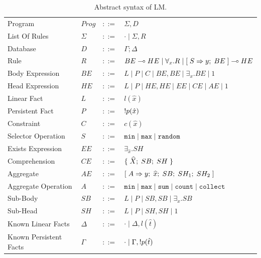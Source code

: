 \begin{table}[h]
\centering
\begin{tabular}{ l l c l }
  Program & $Prog$ & $::=$ & $\Sigma, D$ \\
  List Of Rules & $\Sigma$ & $::=$ & $\cdot \; | \; \Sigma, R$\\
  Database & $D$ & $::=$ & $\Gamma; \Delta$ \\
  Rule & $R$ & $::=$ & $BE \multimap HE \; | \; \forall_{x}. R \; | \; [\; S \Rightarrow y; \; BE \;] \multimap HE$ \\
  Body Expression & $BE$ & $::=$ & $L \; | \; P \; | \; C \; | \; BE, BE \; | \; \exists_{x}. BE \; | \; 1$\\
  Head Expression & $HE$ & $::=$ & $L \; | \; P \; | \; HE, HE \; | \; EE \; | \; CE \; | \; AE \; | \; 1$\\
  
  Linear Fact & $L$ & $::=$ & $l(\hat{x})$\\
  Persistent Fact & $P$ & $::=$ & ${!} p(\hat{x})$\\
  Constraint & $C$ & $::=$ & $c(\hat{x})$ \\
  Selector Operation & $S$ & $::=$ & $\mathtt{min} \; | \; \mathtt{max} \; | \; \mathtt{random}$\\
  
  Exists Expression & $EE$ & $::=$ & $\exists_{\widehat{x}}. SH$ \\
  Comprehension & $CE$ & $::=$ & $\{ \; \widehat{X}; \; SB; \; SH \; \}$ \\

  Aggregate & $AE$ & $::=$ & $[\; A \Rightarrow y; \; \widehat{x}; \; SB; \; SH_1; \; SH_2 \;]$ \\
  Aggregate Operation & $A$ & $::=$ & $\mathtt{min} \; | \; \mathtt{max} \; | \;
\mathtt{sum} \; | \; \mathtt{count} \; | \; \mathtt{collect}$ \\
  
  Sub-Body & $SB$ & $::=$ & $L \; | \; P \; | \; SB, SB \; | \; \exists_{x}. SB$\\
  Sub-Head & $SH$ & $::=$ & $L \; | \; P \; | \; SH, SH \; | \; 1$\\
  
  Known Linear Facts & $\Delta$ & $::=$ & $\cdot \; | \; \Delta, l(\hat{t})$ \\
  Known Persistent Facts & $\Gamma$ & $::=$ & $\cdot \; | \; \Gamma, {!} p(\hat{t})$ \\
\end{tabular}
\caption{Abstract syntax of LM.}\label{tbl:ast}
\end{table}

